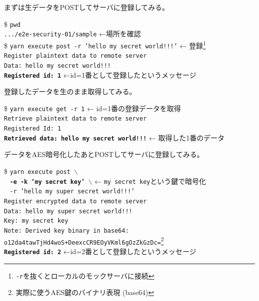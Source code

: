 \documentclass[12pt,dvipdfmx]{beamer}
\begin{document}
\begin{frame}
まずは生データをPOSTしてサーバに登録してみる。
\begin{exampleblock}{}\footnotesize
\$ \texttt{pwd}\\
\texttt{.../e2e-security-01/sample} ←場所を確認\\[1ex]
\$ \texttt{yarn execute post -r 'hello my secret world!!!'} ← \alert{登録}\footnote[frame]{\texttt{-r}を抜くとローカルのモックサーバに接続}\\
\texttt{Register plaintext data to remote server}\\
\texttt{Data: hello my secret world!!!}\\
\textbf{\texttt{Registered id: 1}} ←\alert{id=1番として登録したというメッセージ}
\end{exampleblock}

登録したデータを生のまま取得してみる。
\begin{exampleblock}{}\footnotesize
\$ \texttt{yarn execute get -r 1} ← \alert{id=1番の登録データを取得}\\
\texttt{Retrieve plaintext data to remote server}\\
\texttt{Registered Id: 1}\\
\textbf{\texttt{Retrieved data: hello my secret world!!!}} ← \alert{取得した1番のデータ}
\end{exampleblock}
\end{frame}



\begin{frame}
データをAES暗号化したあとPOSTしてサーバに登録してみる。
\begin{exampleblock}{}\footnotesize
\$ \texttt{yarn execute post $\backslash$}\\
~ \textbf{\texttt{-e -k 'my secret key' $\backslash$}} ← \alert{\texttt{my secret key}という鍵で暗号化}\\
~ \texttt{-r 'hello my super secret world!!!'}\\
\texttt{Register encrypted data to remote server}\\
\texttt{Data: hello my super secret world!!!}\\
\texttt{Key: my secret key}\\
\texttt{Note: Derived key binary in base64: o12da4tawTjHd4woS+DeexcCR9EOyVKml6gOzZkGzDc=}\footnote[frame]{実際に使うAES鍵のバイナリ表現 (base64)}\\
\textbf{\texttt{Registered id: 2}} ←\alert{id=2番として登録したというメッセージ}
\end{exampleblock}

\end{frame}
\end{document}
